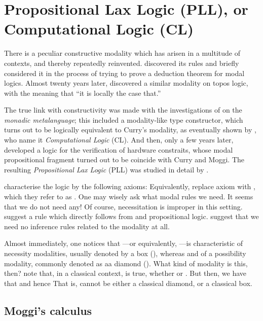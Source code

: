 \documentclass[a4paper]{amsart}
\begin{document}
\section{Propositional Lax Logic \textsf{(PLL)}, or Computational
Logic \textsf{(CL)}}

There is a peculiar constructive modality which has arisen in a
multitude of contexts, and thereby repeatedly reinvented.
\cite{Curry1952} discovered its rules and briefly considered it in
the process of trying to prove a deduction theorem for modal
logics. Almost twenty years later, \cite{Goldblatt1981} discovered
a similar modality on topos logic, with the meaning that ``it is
locally the case that.''

The true link with constructivity was made with the investigations of
\cite{Moggi1991} on the \emph{monadic metalanguage}; this included
a modality-like type constructor, which turns out to be logically
equivalent to Curry's modality, as eventually shown by
\cite{Benton1998}, who name it \emph{Computational Logic}
(\textsf{CL}). And then, only a few years later,
\cite{Mendler1993} developed a logic for the verification of
hardware constraits, whose modal propositional fragment turned out
to be coincide with Curry and Moggi. The resulting
\emph{Propositional Lax Logic} (\textsf{PLL}) was studied in
detail by \cite{Fairtlough1995, Fairtlough1997}.

\cite{Fairtlough1995} characterise the logic by
the following axioms:  Equivalently, \cite{Fairtlough1997} replace axiom
 with , which they refer to as . One
may wisely ask what modal rules we need. It seems that we do not
need any! Of course, necessitation is improper in this setting.
\cite{Fairtlough1997} suggest a rule which directly follows from
 and propositional logic. \cite{Benton1998} suggest
that we need no inference rules related to the modality at all.

Almost immediately, one notices that ---or
equivalently, ---is characteristic of necessity
modalities, usually denoted by a box (), whereas  and  of a possibility modality, commonly denoted
as aa diamond (). What kind of modality is this, then?
\cite{Fairtlough1997} note that, in a classical context,
 is true, whether  or . But then, we have that  and hence  That is,  cannot be either a classical diamond, or a
classical box.

\subsection{Moggi's calculus}
\end{document}
